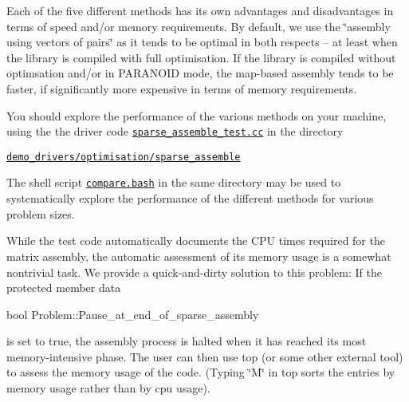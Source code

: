 Each of the five different methods has its own advantages and disadvantages in terms of speed and/or memory requirements. By default, we use the \char`\"{}assembly using vectors of pairs\char`\"{} as it tends to be optimal in both respects -- at least when the library is compiled with full optimisation. If the library is compiled without optimsation and/or in {\ttfamily P\-A\-R\-A\-N\-O\-I\-D} mode, the map-\/based assembly tends to be faster, if significantly more expensive in terms of memory requirements.

You should explore the performance of the various methods on your machine, using the the driver code \href{../../../demo_drivers/optimisation/sparse_assemble/sparse_assemble_test.cc}{\tt sparse\-\_\-assemble\-\_\-test.\-cc} in the directory

\begin{center} \href{../../../demo_drivers/optimisation/sparse_assemble/}{\tt demo\-\_\-drivers/optimisation/sparse\-\_\-assemble} \end{center} 

The shell script \href{../../../demo_drivers/optimisation/sparse_assemble/compare.bash}{\tt compare.\-bash} in the same directory may be used to systematically explore the performance of the different methods for various problem sizes.

While the test code automatically documents the C\-P\-U times required for the matrix assembly, the automatic assessment of its memory usage is a somewhat nontrivial task. We provide a quick-\/and-\/dirty solution to this problem\-: If the protected member data


\begin{DoxyCode}
\textcolor{keywordtype}{bool} Problem::Pause\_at\_end\_of\_sparse\_assembly
\end{DoxyCode}


is set to true, the assembly process is halted when it has reached its most memory-\/intensive phase. The user can then use {\ttfamily top} (or some other external tool) to assess the memory usage of the code. (Typing \char`\"{}\-M\char`\"{} in {\ttfamily top} sorts the entries by memory usage rather than by cpu usage).



